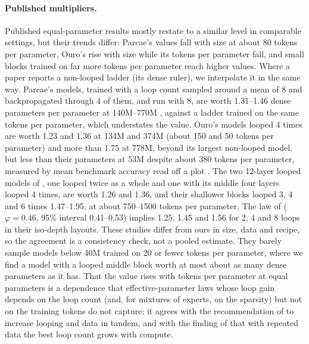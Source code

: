 \paragraph{Published multipliers.}\label{app:published} Published equal-parameter results mostly restate to a similar level in comparable settings, but their trends differ:
Parcae's values fall with size at about 80 tokens per parameter, Ouro's rise with size while its tokens per parameter
fall, and small blocks trained on far more tokens per parameter reach higher values. Where a paper reports a non-looped ladder (its dense ruler), we interpolate it in the
same way. Parcae's models, trained with a loop count sampled around a mean of 8 and backpropagated through 4 of them,
and run with 8, are worth 1.31--1.46 dense parameters per parameter at 140M--770M \citep{prairie2026parcae}, against a
ladder trained on the same tokens per parameter, which understates the value. Ouro's models looped 4 times are worth
1.23 and 1.36 at 134M and 374M (about 150 and 50 tokens per parameter) and more than 1.75 at 778M, beyond its largest
non-looped model, but less than their parameters at 53M despite about 380 tokens per parameter, measured by mean
benchmark accuracy read off a plot \citep[App.~D.1]{zhu2025scaling}. The two 12-layer looped models of \citet{saunshi2025reasoning}, one looped twice as a whole and one with its middle four layers looped 4 times, are worth 1.26 and 1.36, and their shallower blocks looped 3, 4 and 6 times
1.47--1.95, at about 750--1500 tokens per parameter. The law of \citet{schwethelm2026how} ($\varphi = 0.46$, 95\% interval 0.41--0.53) implies 1.25, 1.45 and 1.56
for 2, 4 and 8 loops in their iso-depth layouts. These studies differ from ours in size, data and recipe, so the
agreement is a consistency check, not a pooled estimate. They barely sample models below 40M trained on 20 or fewer
tokens per parameter, where we find a model with a looped middle block worth at most about as many dense
parameters as it has. That the value rises with tokens per
parameter at equal parameters is a dependence that effective-parameter laws whose loop gain depends on the loop
count (and, for mixtures of experts, on the sparsity) but not on the training tokens
\citep{schwethelm2026how,chen2026moe} do not capture; it agrees with the recommendation of \citet{prairie2026parcae} to
increase looping and data in tandem, and with the finding of \citet{chen2026growth} that with repeated data the best
loop count grows with compute.

